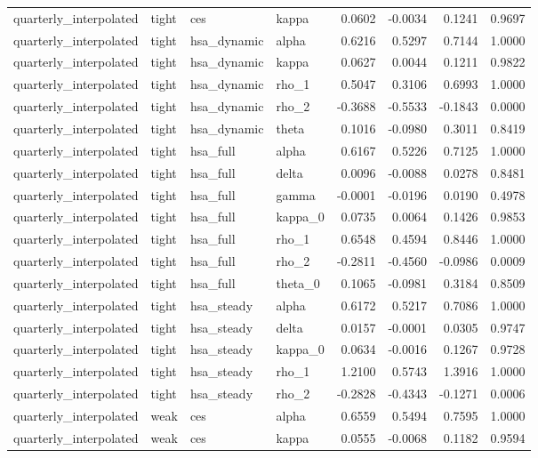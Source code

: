 \begin{tabular}{llllrrrr}
quarterly\_interpolated & tight & ces & kappa & 0.0602 & -0.0034 & 0.1241 & 0.9697 \\
quarterly\_interpolated & tight & hsa\_dynamic & alpha & 0.6216 & 0.5297 & 0.7144 & 1.0000 \\
quarterly\_interpolated & tight & hsa\_dynamic & kappa & 0.0627 & 0.0044 & 0.1211 & 0.9822 \\
quarterly\_interpolated & tight & hsa\_dynamic & rho\_1 & 0.5047 & 0.3106 & 0.6993 & 1.0000 \\
quarterly\_interpolated & tight & hsa\_dynamic & rho\_2 & -0.3688 & -0.5533 & -0.1843 & 0.0000 \\
quarterly\_interpolated & tight & hsa\_dynamic & theta & 0.1016 & -0.0980 & 0.3011 & 0.8419 \\
quarterly\_interpolated & tight & hsa\_full & alpha & 0.6167 & 0.5226 & 0.7125 & 1.0000 \\
quarterly\_interpolated & tight & hsa\_full & delta & 0.0096 & -0.0088 & 0.0278 & 0.8481 \\
quarterly\_interpolated & tight & hsa\_full & gamma & -0.0001 & -0.0196 & 0.0190 & 0.4978 \\
quarterly\_interpolated & tight & hsa\_full & kappa\_0 & 0.0735 & 0.0064 & 0.1426 & 0.9853 \\
quarterly\_interpolated & tight & hsa\_full & rho\_1 & 0.6548 & 0.4594 & 0.8446 & 1.0000 \\
quarterly\_interpolated & tight & hsa\_full & rho\_2 & -0.2811 & -0.4560 & -0.0986 & 0.0009 \\
quarterly\_interpolated & tight & hsa\_full & theta\_0 & 0.1065 & -0.0981 & 0.3184 & 0.8509 \\
quarterly\_interpolated & tight & hsa\_steady & alpha & 0.6172 & 0.5217 & 0.7086 & 1.0000 \\
quarterly\_interpolated & tight & hsa\_steady & delta & 0.0157 & -0.0001 & 0.0305 & 0.9747 \\
quarterly\_interpolated & tight & hsa\_steady & kappa\_0 & 0.0634 & -0.0016 & 0.1267 & 0.9728 \\
quarterly\_interpolated & tight & hsa\_steady & rho\_1 & 1.2100 & 0.5743 & 1.3916 & 1.0000 \\
quarterly\_interpolated & tight & hsa\_steady & rho\_2 & -0.2828 & -0.4343 & -0.1271 & 0.0006 \\
quarterly\_interpolated & weak & ces & alpha & 0.6559 & 0.5494 & 0.7595 & 1.0000 \\
quarterly\_interpolated & weak & ces & kappa & 0.0555 & -0.0068 & 0.1182 & 0.9594 \\

\end{tabular}
